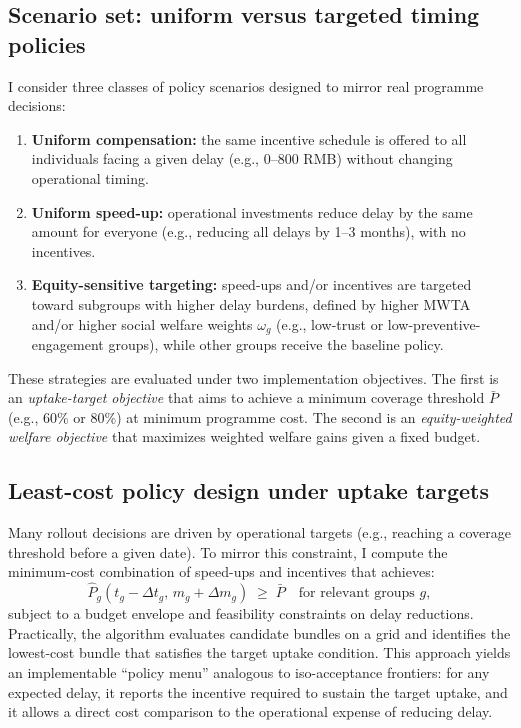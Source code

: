 \documentclass[doublespacing]{utdthesis}
\begin{document}
\subsection{Scenario set: uniform versus targeted timing policies}
\label{subsec:essay3_scenarios}

I consider three classes of policy scenarios designed to mirror real programme decisions:

\begin{enumerate}
\item \textbf{Uniform compensation:} the same incentive schedule is offered to all individuals facing a given delay (e.g., 0--800 RMB) without changing operational timing.
\item \textbf{Uniform speed-up:} operational investments reduce delay by the same amount for everyone (e.g., reducing all delays by 1--3 months), with no incentives.
\item \textbf{Equity-sensitive targeting:} speed-ups and/or incentives are targeted toward subgroups with higher delay burdens, defined by higher MWTA and/or higher social welfare weights $\omega_g$ (e.g., low-trust or low-preventive-engagement groups), while other groups receive the baseline policy.
\end{enumerate}

These strategies are evaluated under two implementation objectives. The first is an \emph{uptake-target objective} that aims to achieve a minimum coverage threshold $\bar{P}$ (e.g., 60\% or 80\%) at minimum programme cost. The second is an \emph{equity-weighted welfare objective} that maximizes weighted welfare gains given a fixed budget.

\subsection{Least-cost policy design under uptake targets}
\label{subsec:essay3_least_cost}

Many rollout decisions are driven by operational targets (e.g., reaching a coverage threshold before a given date). To mirror this constraint, I compute the minimum-cost combination of speed-ups and incentives that achieves:
\begin{equation}
\widehat{P}_g(t_g-\Delta t_g,\, m_g+\Delta m_g) \;\ge\; \bar{P}
\quad \text{for relevant groups } g,
\end{equation}
subject to a budget envelope and feasibility constraints on delay reductions. Practically, the algorithm evaluates candidate bundles on a grid and identifies the lowest-cost bundle that satisfies the target uptake condition. This approach yields an implementable ``policy menu'' analogous to iso-acceptance frontiers: for any expected delay, it reports the incentive required to sustain the target uptake, and it allows a direct cost comparison to the operational expense of reducing delay.
\end{document}
